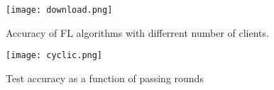 








\begin{figure}[h!]
 \centering
 \texttt{[image: download.png]}
 \caption{Accuracy of FL algorithms with differrent number of clients. }
 \label{fig:data distribution}
\end{figure}



 
\begin{figure}[h!]
 \centering
 \texttt{[image: cyclic.png]}
 \caption{Test accuracy as a function of passing rounds}
 \label{seq-vs-noseq}
\end{figure}

